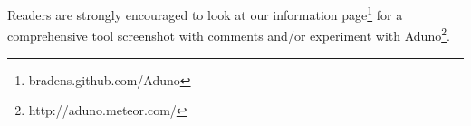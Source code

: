 \documentclass[conference]{IEEEtran}
\begin{document}
Readers are strongly encouraged to look at our information page\footnote{bradens.github.com/Aduno} for a comprehensive tool screenshot with comments and/or experiment with Aduno\footnote{http://aduno.meteor.com/}.

%  
%
%
%
%
%
%
% 
%
%
\end{document}

